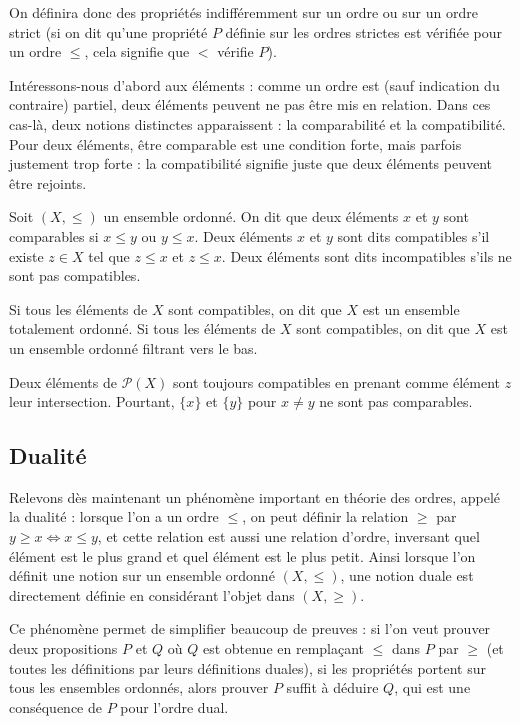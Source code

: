 On définira donc des propriétés indifféremment sur un ordre ou sur un ordre
strict (si on dit qu'une propriété $P$ définie sur les ordres strictes est
vérifiée pour un ordre $\leq$, cela signifie que $<$ vérifie $P$).

Intéressons-nous d'abord aux éléments : comme un ordre est (sauf indication du
contraire) partiel, deux éléments peuvent ne pas être mis en relation. Dans ces
cas-là, deux notions distinctes apparaissent : la comparabilité et la
compatibilité. Pour deux éléments, être comparable est une condition forte,
mais parfois justement trop forte : la compatibilité signifie juste que deux
éléments peuvent être rejoints.

\begin{definition}
  Soit $(X,\leq)$ un ensemble ordonné. On dit que deux éléments $x$ et $y$ sont
  comparables si $x\leq y$ ou $y\leq x$. Deux éléments $x$ et $y$ sont dits
  compatibles s'il existe $z \in X$ tel que $z\leq x$ et $z\leq x$. Deux éléments
  sont dits incompatibles s'ils ne sont pas compatibles.

  Si tous les éléments de $X$ sont compatibles, on dit que $X$ est un ensemble
  totalement ordonné.
  Si tous les éléments de $X$ sont compatibles, on dit que $X$ est un ensemble
  ordonné filtrant vers le bas.
\end{definition}

\begin{example}
  Deux éléments de $\mathcal P(X)$ sont toujours compatibles en prenant comme
  élément $z$ leur intersection. Pourtant, $\{x\}$ et $\{y\}$ pour $x\neq y$ ne
  sont pas comparables.
\end{example}

\subsection{Dualité}

Relevons dès maintenant un phénomène important en théorie des ordres, appelé la
dualité : lorsque l'on a un ordre $\leq$, on peut définir la relation $\geq$
par $y\geq x \iff x\leq y$, et cette relation est aussi une relation d'ordre,
inversant quel élément est le plus grand et quel élément est le plus petit. Ainsi
lorsque l'on définit une notion sur un ensemble ordonné $(X,\leq)$, une notion
duale est directement définie en considérant l'objet dans $(X,\geq)$.

Ce phénomène permet de simplifier beaucoup de preuves : si l'on veut prouver deux
propositions $P$ et $Q$ où $Q$ est obtenue en remplaçant $\leq$ dans $P$ par
$\geq$ (et toutes les définitions par leurs définitions duales), si les
propriétés portent sur tous les ensembles ordonnés, alors prouver $P$ suffit à
déduire $Q$, qui est une conséquence de $P$ pour l'ordre dual.

